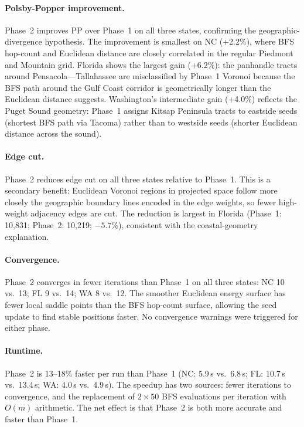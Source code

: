 \paragraph{Polsby-Popper improvement.}
Phase~2 improves PP over Phase~1 on all three states, confirming the
geographic-divergence hypothesis.
The improvement is smallest on NC (+2.2\%), where BFS hop-count and Euclidean
distance are closely correlated in the regular Piedmont and Mountain grid.
Florida shows the largest gain (+6.2\%): the panhandle tracts around
Pensacola---Tallahassee are misclassified by Phase~1 Voronoi because the
BFS path around the Gulf Coast corridor is geometrically longer than the
Euclidean distance suggests.
Washington's intermediate gain (+4.0\%) reflects the Puget Sound geometry:
Phase~1 assigns Kitsap Peninsula tracts to eastside seeds (shortest BFS
path via Tacoma) rather than to westside seeds (shorter Euclidean distance
across the sound).

\paragraph{Edge cut.}
Phase~2 reduces edge cut on all three states relative to Phase~1.
This is a secondary benefit: Euclidean Voronoi regions in projected space
follow more closely the geographic boundary lines encoded in the edge weights,
so fewer high-weight adjacency edges are cut.
The reduction is largest in Florida (Phase~1: 10{,}831; Phase~2: 10{,}219;
$-5.7\%$), consistent with the coastal-geometry explanation.

\paragraph{Convergence.}
Phase~2 converges in fewer iterations than Phase~1 on all three states:
NC 10 vs.\ 13; FL 9 vs.\ 14; WA 8 vs.\ 12.
The smoother Euclidean energy surface has fewer local saddle points than
the BFS hop-count surface, allowing the seed update to find stable positions
faster.
No convergence warnings were triggered for either phase.

\paragraph{Runtime.}
Phase~2 is 13--18\% faster per run than Phase~1 (NC: 5.9\,s vs.\ 6.8\,s;
FL: 10.7\,s vs.\ 13.4\,s; WA: 4.0\,s vs.\ 4.9\,s).
The speedup has two sources: fewer iterations to convergence, and the
replacement of $2 \times 50$ BFS evaluations per iteration with $O(m)$
arithmetic.
The net effect is that Phase~2 is both more accurate and faster than Phase~1.

